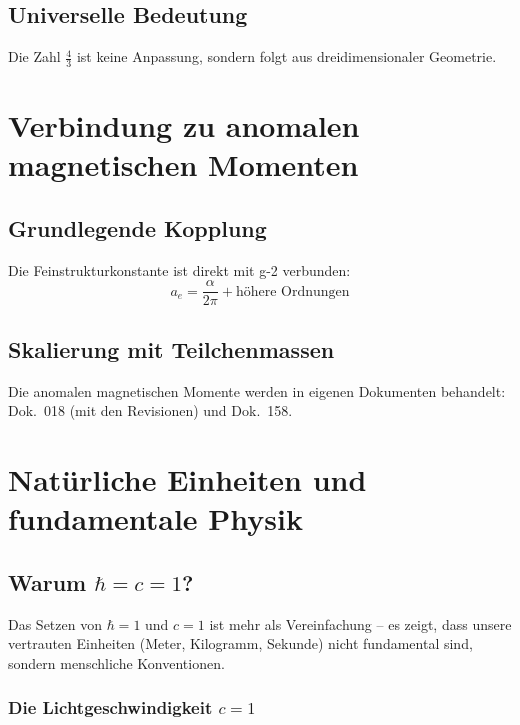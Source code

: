 	\subsection{Universelle Bedeutung}
	
	Die Zahl $\frac{4}{3}$ ist keine Anpassung, sondern folgt aus dreidimensionaler Geometrie.
	
	\section{Verbindung zu anomalen magnetischen Momenten}
	
	\subsection{Grundlegende Kopplung}
	
	Die Feinstrukturkonstante ist direkt mit g-2 verbunden:
	\begin{equation}
		a_e = \frac{\alpha}{2\pi} + \text{höhere Ordnungen}
	\end{equation}
	
		\subsection{Skalierung mit Teilchenmassen}

	Die anomalen magnetischen Momente werden in eigenen Dokumenten behandelt: Dok.~018 (mit den Revisionen) und Dok.~158.

	\section{Natürliche Einheiten und fundamentale Physik}
	\label{sec:natural_units}
	
	\subsection[Warum hbar = c = 1]{Warum $\hbar = c = 1$?}
	
	Das Setzen von $\hbar = 1$ und $c = 1$ ist mehr als Vereinfachung – es zeigt, dass unsere vertrauten Einheiten (Meter, Kilogramm, Sekunde) nicht fundamental sind, sondern menschliche Konventionen.
	
	\subsubsection{Die Lichtgeschwindigkeit $c = 1$}
	
